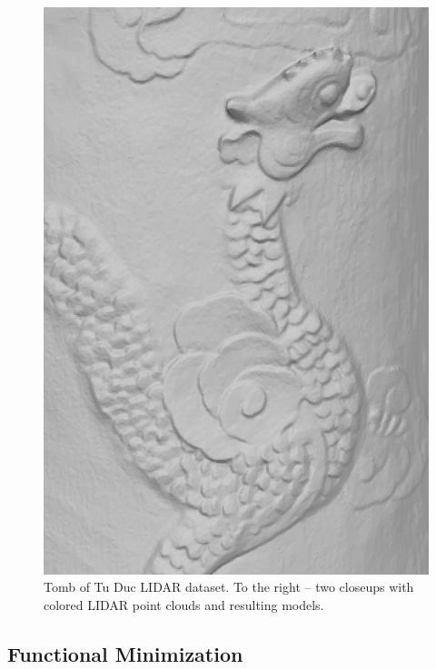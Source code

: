 \documentclass[10pt,twocolumn,letterpaper]{article}
\begin{document}
\begin{figure}
\begin{minipage}[b]{0.30\linewidth}
\begin{minipage}[b]{0.48\linewidth}
        \end{minipage}
        \begin{minipage}[b]{0.48\linewidth}
            \includegraphics[width=\textwidth]{images/figures/results/tomb_lidar/dragon_mesh.jpg}
        \end{minipage}
    \end{minipage}
    \caption{Tomb of Tu Duc LIDAR dataset. To the right -- two closeups with colored LIDAR point clouds and resulting models.}
    \label{fig:tomb_lidar}
\end{figure}

\subsection{Functional Minimization}
\label{sec:iters}
\end{document}
